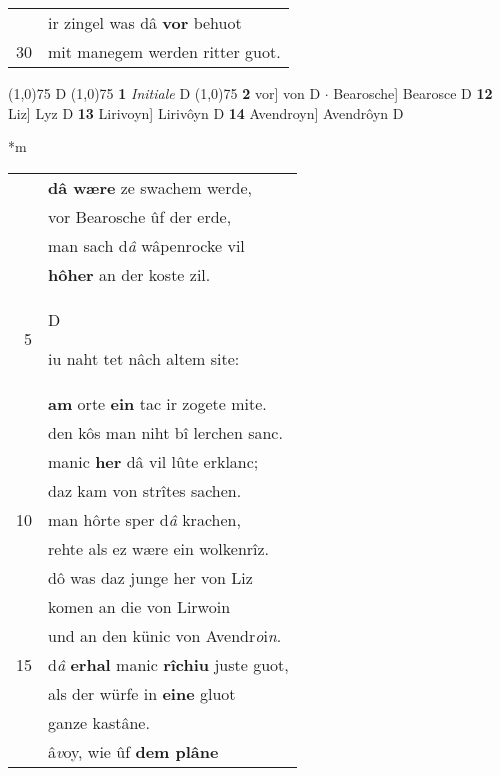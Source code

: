 \documentclass[8pt,a4paper,notitlepage]{article}
\begin{document}
\begin{table}[ht]
\begin{minipage}[t]{0.5\linewidth}
\begin{tabular}{rl}
 & ir zingel was dâ \textbf{vor} behuot\\ 
30 & mit manegem werden ritter guot.\\ 
\end{tabular}
\scriptsize
\line(1,0){75} \newline
D \newline
\line(1,0){75} \newline
\textbf{1} \textit{Initiale} D  \newline
\line(1,0){75} \newline
\textbf{2} vor] von D  $\cdot$ Bearosche] Bearosce D \textbf{12} Liz] Lyz D \textbf{13} Lirivoyn] Lirivôyn D \textbf{14} Avendroyn] Avendrôyn D \newline
\end{minipage}
\hspace{0.5cm}
\begin{minipage}[t]{0.5\linewidth}
\small
\begin{center}*m
\end{center}
\begin{tabular}{rl}
 & \textbf{dâ wære} ze swachem werde,\\ 
 & vor Bearosche ûf der erde,\\ 
 & man sach d\textit{â} wâpenrocke vil\\ 
 & \textbf{hôher} an der koste zil.\\ 
5 & \begin{large}D\end{large}iu naht tet nâch altem site:\\ 
 & \textbf{am} orte \textbf{ein} tac ir zogete mite.\\ 
 & den kôs man niht bî lerchen sanc.\\ 
 & manic \textbf{her} dâ vil lûte erklanc;\\ 
 & daz kam von strîtes sachen.\\ 
10 & man hôrte sper d\textit{â} krachen,\\ 
 & rehte als ez wære ein wolkenrîz.\\ 
 & dô was daz junge her von Liz\\ 
 & komen an die von Lirwoin\\ 
 & und an den künic von Avendr\textit{o}i\textit{n}.\\ 
15 & d\textit{â} \textbf{erhal} manic \textbf{rîchiu} juste guot,\\ 
 & als der würfe in \textbf{eine} gluot\\ 
 & ganze kastâne.\\ 
 & â\textit{v}oy, wie ûf \textbf{dem plâne}\\ 

\end{tabular}
\end{minipage}
\end{table}
\end{document}
